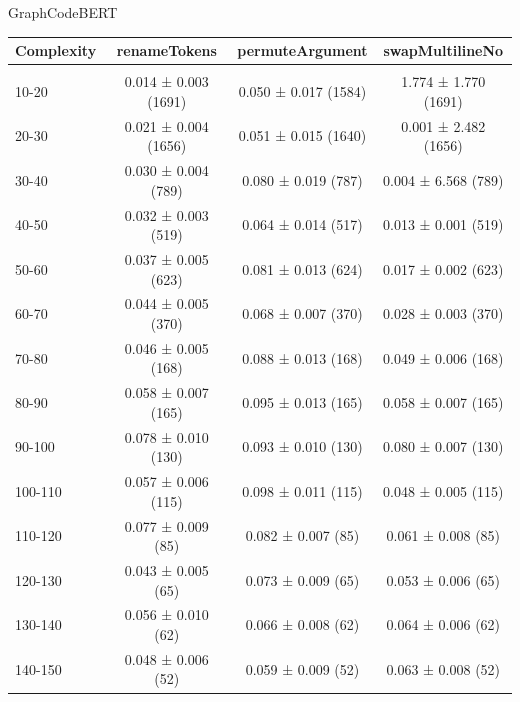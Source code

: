 \documentclass[sigconf,review,anonymous]{acmart}
\begin{document}
{  GraphCodeBERT
    \begin{table}[H]
      \tiny
      \begin{tabular}{l|ccc}
        Complexity          & renameTokens        & permuteArgument     & swapMultilineNo     \\\hline\\
        10-20               & 0.014 ± 0.003 (1691)& 0.050 ± 0.017 (1584)& 1.774 ± 1.770 (1691)\\
        20-30               & 0.021 ± 0.004 (1656)& 0.051 ± 0.015 (1640)& 0.001 ± 2.482 (1656)\\
        30-40               & 0.030 ± 0.004 (789) & 0.080 ± 0.019 (787) & 0.004 ± 6.568 (789) \\
        40-50               & 0.032 ± 0.003 (519) & 0.064 ± 0.014 (517) & 0.013 ± 0.001 (519) \\
        50-60               & 0.037 ± 0.005 (623) & 0.081 ± 0.013 (624) & 0.017 ± 0.002 (623) \\
        60-70               & 0.044 ± 0.005 (370) & 0.068 ± 0.007 (370) & 0.028 ± 0.003 (370) \\
        70-80               & 0.046 ± 0.005 (168) & 0.088 ± 0.013 (168) & 0.049 ± 0.006 (168) \\
        80-90               & 0.058 ± 0.007 (165) & 0.095 ± 0.013 (165) & 0.058 ± 0.007 (165) \\
        90-100              & 0.078 ± 0.010 (130) & 0.093 ± 0.010 (130) & 0.080 ± 0.007 (130) \\
        100-110             & 0.057 ± 0.006 (115) & 0.098 ± 0.011 (115) & 0.048 ± 0.005 (115) \\
        110-120             & 0.077 ± 0.009 (85)  & 0.082 ± 0.007 (85)  & 0.061 ± 0.008 (85)  \\
        120-130             & 0.043 ± 0.005 (65)  & 0.073 ± 0.009 (65)  & 0.053 ± 0.006 (65)  \\
        130-140             & 0.056 ± 0.010 (62)  & 0.066 ± 0.008 (62)  & 0.064 ± 0.006 (62)  \\
        140-150             & 0.048 ± 0.006 (52)  & 0.059 ± 0.009 (52)  & 0.063 ± 0.008 (52)  \\
      \end{tabular}
    \end{table}

}
\end{document}
